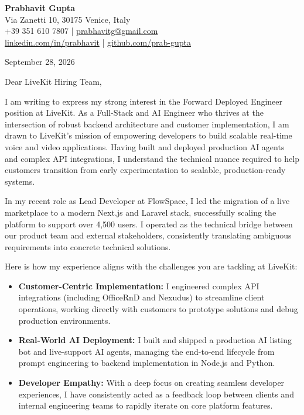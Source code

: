 \documentclass[11pt,a4paper]{article}
\begin{document}
\begin{center}
    {\Huge \textbf{Prabhavit Gupta}}\\[10pt]
    Via Zanetti 10, 30175 Venice, Italy \\
    +39 351 610 7807 \quad | \quad \href{mailto:prabhavitg@gmail.com}{prabhavitg@gmail.com} \\
    \href{https://www.linkedin.com/in/prabhavit/}{linkedin.com/in/prabhavit} \quad | \quad \href{https://github.com/prab-gupta}{github.com/prab-gupta}
\end{center}

\vspace{1em}

September 28, 2026

\vspace{1em}

Dear LiveKit Hiring Team,

I am writing to express my strong interest in the Forward Deployed Engineer position at LiveKit. As a Full-Stack and AI Engineer who thrives at the intersection of robust backend architecture and customer implementation, I am drawn to LiveKit's mission of empowering developers to build scalable real-time voice and video applications. Having built and deployed production AI agents and complex API integrations, I understand the technical nuance required to help customers transition from early experimentation to scalable, production-ready systems.

In my recent role as Lead Developer at FlowSpace, I led the migration of a live marketplace to a modern Next.js and Laravel stack, successfully scaling the platform to support over 4,500 users. I operated as the technical bridge between our product team and external stakeholders, consistently translating ambiguous requirements into concrete technical solutions.

Here is how my experience aligns with the challenges you are tackling at LiveKit:
\begin{itemize}
    \item \textbf{Customer-Centric Implementation:} I engineered complex API integrations (including OfficeRnD and Nexudus) to streamline client operations, working directly with customers to prototype solutions and debug production environments.
    \item \textbf{Real-World AI Deployment:} I built and shipped a production AI listing bot and live-support AI agents, managing the end-to-end lifecycle from prompt engineering to backend implementation in Node.js and Python.
    \item \textbf{Developer Empathy:} With a deep focus on creating seamless developer experiences, I have consistently acted as a feedback loop between clients and internal engineering teams to rapidly iterate on core platform features.
\end{itemize}
\end{document}
